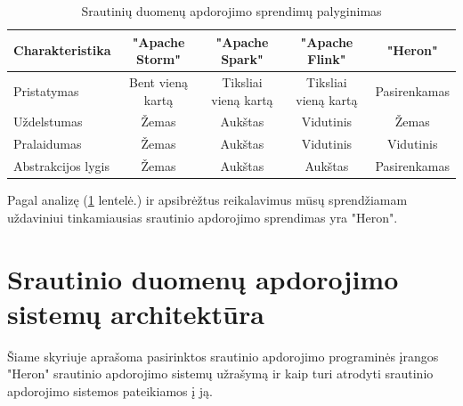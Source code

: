 \documentclass{VUMIFPSbakalaurinis}
\begin{document}
\begin{table}[!htbp]
    \begin{center}
        \caption{Srautinių duomenų apdorojimo sprendimų palyginimas}
        \label{table:comparer}
        \begin{tabular}{ | l | c | c | c | c | }
            \hline
            \cellcolor[gray]{0.8} Charakteristika & \cellcolor[gray]{0.9} "Apache Storm" & \cellcolor[gray]{0.9} "Apache Spark" & \cellcolor[gray]{0.9} "Apache Flink" & \cellcolor[gray]{0.9} "Heron" \\* \hline
            \cellcolor[gray]{0.9} Pristatymas & Bent vieną kartą & Tiksliai vieną kartą & Tiksliai vieną kartą & Pasirenkamas \\* \hline
            \cellcolor[gray]{0.9} Uždelstumas & Žemas & Aukštas & Vidutinis & Žemas \\* \hline
            \cellcolor[gray]{0.9} Pralaidumas & Žemas & Aukštas & Vidutinis & Vidutinis \\* \hline
            \cellcolor[gray]{0.9} Abstrakcijos lygis & Žemas & Aukštas & Aukštas & Pasirenkamas \\* \hline
        \end{tabular}
    \end{center}
\end{table}\par

Pagal analizę (\ref{table:comparer} lentelė.) ir apsibrėžtus reikalavimus mūsų sprendžiamam uždaviniui tinkamiausias srautinio apdorojimo sprendimas yra "Heron". \par

\section{Srautinio duomenų apdorojimo sistemų architektūra}

Šiame skyriuje aprašoma pasirinktos srautinio apdorojimo programinės įrangos "Heron" srautinio apdorojimo sistemų užrašymą ir kaip turi atrodyti srautinio apdorojimo sistemos pateikiamos į ją.
\end{document}
